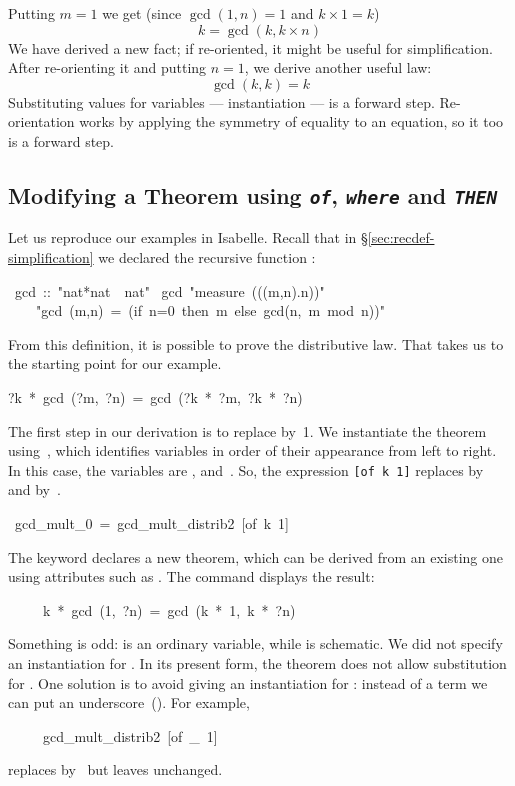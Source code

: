Putting $m=1$ we get (since $\gcd(1,n)=1$ and $k\times1=k$) 
\[ k = \gcd(k,k\times n)\]
We have derived a new fact; if re-oriented, it might be
useful for simplification.  After re-orienting it and putting $n=1$, we
derive another useful law: 
\[ \gcd(k,k)=k \]
Substituting values for variables --- instantiation --- is a forward step. 
Re-orientation works by applying the symmetry of equality to 
an equation, so it too is a forward step.  

\subsection{Modifying a Theorem using {\tt\slshape of},  {\tt\slshape where}
 and {\tt\slshape THEN}}

\label{sec:THEN}

Let us reproduce our examples in Isabelle.  Recall that in
{\S}\ref{sec:recdef-simplification} we declared the recursive function
:
\begin{isabelle}
\ gcd\ ::\ "nat*nat\ \isasymRightarrow\ nat"\isanewline
{}\ gcd\ "measure\ ((\isasymlambda(m,n).n))"\isanewline
\ \ \ \ "gcd\ (m,n)\ =\ (if\ n=0\ then\ m\ else\ gcd(n,\ m\ mod\ n))"
\end{isabelle}
%
From this definition, it is possible to prove the distributive law.  
That takes us to the starting point for our example.
\begin{isabelle}
?k\ *\ gcd\ (?m,\ ?n)\ =\ gcd\ (?k\ *\ ?m,\ ?k\ *\ ?n)
\end{isabelle}
%
The first step in our derivation is to replace  by~1.  We instantiate the
theorem using~, which identifies variables in order of their
appearance from left to right.  In this case, the variables  are , 
and~. So, the expression
\hbox{\texttt{[of k 1]}} replaces  by~ and 
by~.
\begin{isabelle}
\ gcd_mult_0\ =\ gcd_mult_distrib2\ [of\ k\ 1]
\end{isabelle}
%
The keyword  declares a new theorem, which can be derived
from an existing one using attributes such as \isa{[of~k~1]}.
The command 
displays the result:
\begin{isabelle}
\ \ \ \ \ k\ *\ gcd\ (1,\ ?n)\ =\ gcd\ (k\ *\ 1,\ k\ *\ ?n)
\end{isabelle}
Something is odd:  is an ordinary variable, while  
is schematic.  We did not specify an instantiation 
for .  In its present form, the theorem does not allow 
substitution for .  One solution is to avoid giving an instantiation for
: instead of a term we can put an underscore~(\isa{_}).  For example,
\begin{isabelle}
\ \ \ \ \ gcd_mult_distrib2\ [of\ _\ 1]
\end{isabelle}
replaces  by~ but leaves  unchanged.  


